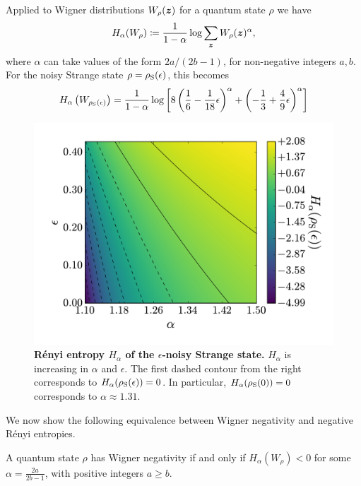 \documentclass[pra,
aps,
twocolumn,
superscriptaddress,
groupedaddress,
nofootinbib,
reprint
]{revtex4-1}
\begin{document}
Applied to Wigner distributions $W_\rho (\boldsymbol{z})$ for a quantum state $\rho$ we have
\begin{equation}
	H_\alpha(W_\rho) \coloneqq \frac{1}{1-\alpha} \log \sum_{\bm{z}} W_{\rho}(\bm{z})^\alpha,
\end{equation}
where $\alpha$ can take values of the form $2a / (2b-1)$, for non-negative integers $a,b$. For the noisy Strange state $\rho = \rho_{\rm{S}}(\epsilon)$, this becomes
\begin{align}
	H_{\alpha}\left(W_{\rho_{\rm{S}}(\epsilon)}\right) = \frac{1}{1-\alpha}\log \left[ 8\left( \frac{1}{6} - \frac{1}{18}\epsilon \right)^\alpha + \left(-\frac{1}{3} + \frac{4}{9}\epsilon \right)^\alpha \right] \nonumber\\
\end{align}
\begin{figure}[t!]
    \centering
    \includegraphics[scale=0.35]{figs/H_vs_eps_a.pdf}
    \caption{\textbf{R\'{e}nyi entropy $H_\alpha$ of the $\epsilon$-noisy Strange state.} $H_\alpha$ is increasing in $\alpha$ and $\epsilon$. The first dashed contour from the right corresponds to $H_\alpha(\rho_{\rm{S}}(\epsilon)) = 0$. In particular, $H_\alpha(\rho_{\rm{S}}(0)) = 0$ corresponds to $\alpha \approx 1.31$.
    }
    \label{fig:H}
\end{figure}
We now show the following equivalence between Wigner negativity and negative R\'{e}nyi entropies.
\begingroup
\def\thetheorem{\ref{thm:Magic}}
\begin{theorem}
	A quantum state $\rho$ has Wigner negativity if and only if $H_\alpha(W_\rho) < 0$ for some $\alpha =  \frac{2a}{2b-1}$, with positive integers $a \geq b$.
\end{theorem}
\end{document}
